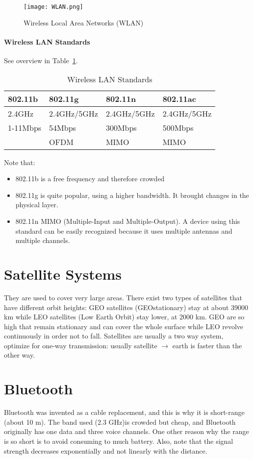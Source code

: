 \begin{figure}[t]
  \centering
  \texttt{[image: WLAN.png]}
  \caption{Wireless Local Area Networks (WLAN)}			
  
  \label{fig:cws:WLAN}
\end{figure}

\paragraph*{Wireless LAN Standards}
See overview in Table~\ref{tab:cws:WLANStd}.
\begin{table}[b]
\centering
\begin{tabular}{|l|l|l|l|}
\hline
\textbf{802.11b}  & \textbf{802.11g}     & \textbf{802.11n}     & \textbf{802.11ac}    \\ \hline
2.4GHz   & 2.4GHz/5GHz & 2.4GHz/5GHz & 2.4GHz/5GHz \\ \hline
1-11Mbps & 54Mbps      & 300Mbps     & 500Mbps     \\ \hline
         & OFDM        & MIMO        & MIMO        \\ \hline
\end{tabular}
\caption{Wireless LAN Standards}
\label{tab:cws:WLANStd}
\end{table}


Note that:
\begin{itemize}
\item 802.11b is a free frequency and therefore crowded
\item 802.11g is quite popular, using a higher bandwidth. It 
  brought changes in the physical layer.
\item 802.11n MIMO (Multiple-Input and Multiple-Output). A 
  device using this standard can be easily recognized because it uses multiple 
  antennas and multiple channels.
\end{itemize}

\section{Satellite Systems}
They are used to cover very large areas. There exist two types of 
satellites that have different orbit heights: GEO satellites (GEOstationary) 
stay at about 39000 km while LEO satellites (Low Earth Orbit) stay lower, at 
2000 km. GEO are so high that remain stationary and can cover the whole surface 
while LEO revolve continuously in order not to fall.
Satellites are usually a two way system, optimize for one-way 
transmission: usually satellite $\to$ earth is faster than the other way.

\section{Bluetooth}
Bluetooth was invented as a cable replacement, and this is why it is 
short-range (about 10 m). The band used (2.3 GHz)is crowded but cheap, and 
Bluetooth originally has one data and three voice channels.
One other reason why the range is so short is to avoid consuming to much 
battery. Also, note that the signal strength decreases exponentially and not 
linearly with the distance.


